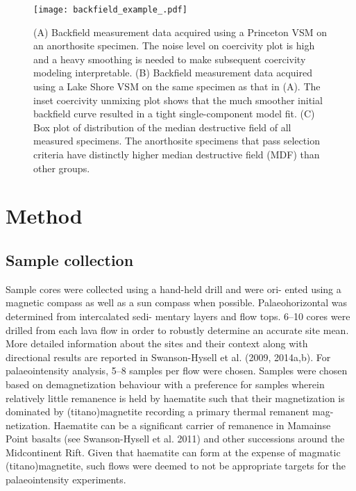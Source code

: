\documentclass[draft]{agujournal2019}
\begin{document}
\begin{figure}
\begin{center}
	\noindent\texttt{[image: backfield\_example\_.pdf]}
\end{center}
\caption{\small{(A) Backfield measurement data acquired using a Princeton VSM on an anorthosite specimen. The noise level on coercivity plot is high and a heavy smoothing is needed to make subsequent coercivity modeling interpretable. (B) Backfield measurement data acquired using a Lake Shore VSM on the same specimen as that in (A). The inset coercivity unmixing plot shows that the much smoother initial backfield curve resulted in a tight single-component model fit. (C) Box plot of distribution of the median destructive field of all measured specimens. The anorthosite specimens that pass selection criteria have distinctly higher median destructive field (MDF) than other groups.}}
\label{fig:backfield}
\end{figure}










\section*{Method}
\subsection*{Sample collection}
Sample cores were collected using a hand-held drill and were ori- ented using a magnetic compass as well as a sun compass when possible. Palaeohorizontal was determined from intercalated sedi- mentary layers and flow tops. 6–10 cores were drilled from each lava flow in order to robustly determine an accurate site mean. More detailed information about the sites and their context along with directional results are reported in Swanson-Hysell et al. (2009, 2014a,b). For palaeointensity analysis, 5–8 samples per flow were chosen. Samples were chosen based on demagnetization behaviour with a preference for samples wherein relatively little remanence is held by haematite such that their magnetization is dominated by (titano)magnetite recording a primary thermal remanent mag- netization. Haematite can be a significant carrier of remanence in Mamainse Point basalts (see Swanson-Hysell et al. 2011) and other successions around the Midcontinent Rift. Given that haematite can form at the expense of magmatic (titano)magnetite, such flows were deemed to not be appropriate targets for the palaeointensity experiments.
\end{document}
